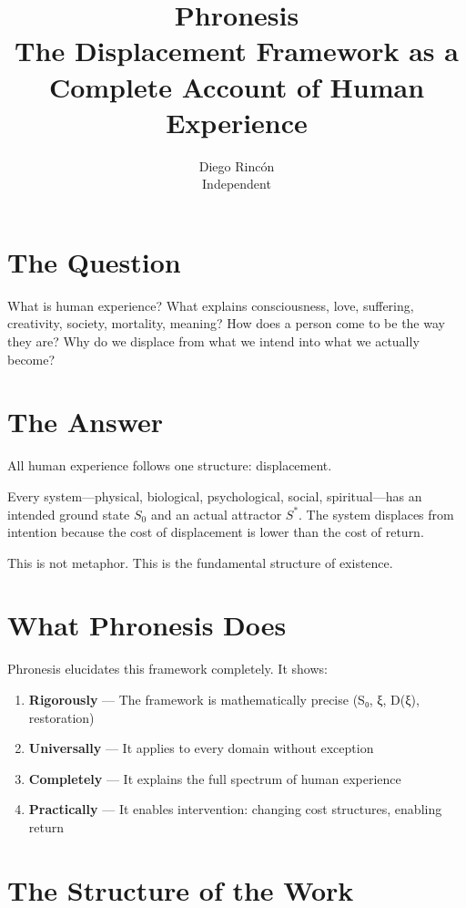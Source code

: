 \documentclass[12pt]{article}
\title{\textbf{Phronesis}\\
\large The Displacement Framework as a Complete Account of Human Experience}
\author{Diego Rincón\\
\small Independent}
\date{}
\begin{document}
\maketitle

\section*{The Question}

What is human experience? What explains consciousness, love, suffering, creativity, society, mortality, meaning? How does a person come to be the way they are? Why do we displace from what we intend into what we actually become?

\section*{The Answer}

All human experience follows one structure: displacement.

Every system—physical, biological, psychological, social, spiritual—has an intended ground state $S_0$ and an actual attractor $S^*$. The system displaces from intention because the cost of displacement is lower than the cost of return.

This is not metaphor. This is the fundamental structure of existence.

\section*{What Phronesis Does}

Phronesis elucidates this framework completely. It shows:

\begin{enumerate}
\item \textbf{Rigorously} — The framework is mathematically precise (S₀, ξ, D(ξ), restoration)
\item \textbf{Universally} — It applies to every domain without exception
\item \textbf{Completely} — It explains the full spectrum of human experience
\item \textbf{Practically} — It enables intervention: changing cost structures, enabling return
\end{enumerate}

\section*{The Structure of the Work}
\end{document}
